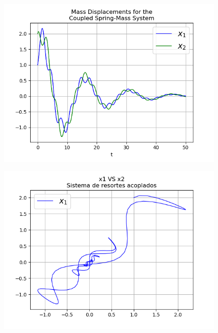 \documentclass{article}
\begin{document}
\begin{figure}[h]
\centering
\includegraphics[scale=0.5]{r12.png}
\label{figure: Resortes acoplados }
\end{figure}

\begin{figure}[h]
\centering
\includegraphics[scale=0.5]{r13.png}
\label{figure: Resortes acoplados }
\end{figure}
\end{document}

